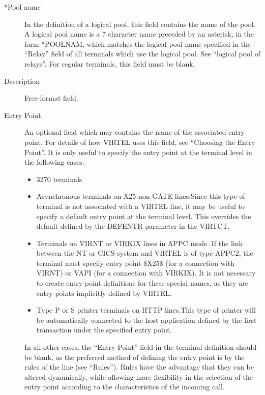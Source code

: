 \documentclass[letterpaper,10pt,english]{sphinxmanual}
\begin{document}
\begin{description}
\item[{*Pool name}] \leavevmode
In the definition of a logical pool, this field contains the name of the pool. A logical pool name is a 7 character name preceded by an asterisk, in the form *POOLNAM, which matches the logical pool name specified in the “Relay” field of all terminals which use the logical pool. See “logical pool of relays”. For regular terminals, this field must be blank.

\item[{Description}] \leavevmode
Free-format field.

\item[{Entry Point}] \leavevmode
An optional field which may contains the name of the associated entry point. For details of how VIRTEL uses this field, see “Choosing the Entry Point”. It is only useful to specify the entry point at the terminal level in the following cases:
\begin{itemize}
\item {} 
3270 terminals

\item {} 
Asynchronous terminals on X25 non-GATE lines.Since this type of terminal is not associated with a VIRTEL line, it may be useful to specify a default entry point at the terminal level. This overrides the default defined by the DEFENTR parameter in the VIRTCT.

\item {} 
Terminals on VIRNT or VIRKIX lines in APPC mode. If the link between the NT or CICS system and VIRTEL is of type APPC2, the terminal must specify entry point \$X25\$ (for a connection with VIRNT) or VAPI (for a connection with VIRKIX). It is not necessary to create entry point definitions for these special names, as they are entry points implicitly defined by VIRTEL.

\item {} 
Type P or S printer terminals on HTTP lines.This type of printer will be automatically connected to the host application defined by the first transaction under the specified entry point.

\end{itemize}

In all other cases, the “Entry Point” field in the terminal definition should be blank, as the preferred method of defining the entry point is by the rules of the line (see “Rules”). Rules have the advantage that they can be
altered dynamically, while allowing more flexibility in the selection of the entry point according to the characteristics of the incoming call.


\end{description}
\end{document}
